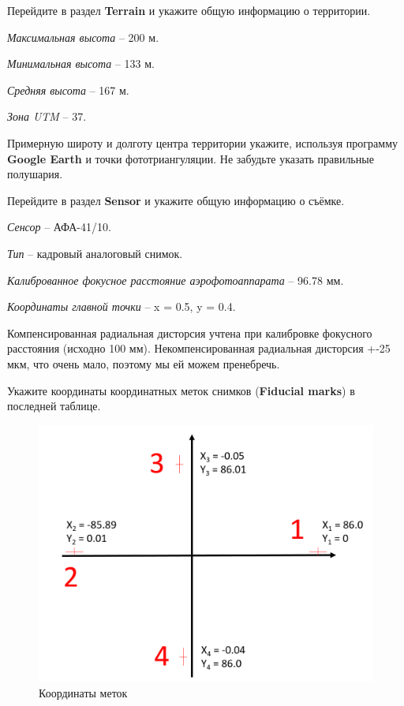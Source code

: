 \documentclass[
  12pt,
]{book}
\begin{document}
Перейдите в раздел \textbf{Terrain} и укажите общую информацию о территории.

\emph{Максимальная высота} -- 200 м.

\emph{Минимальная высота} -- 133 м.

\emph{Средняя высота} -- 167 м.

\emph{Зона UTM} -- 37.

Примерную широту и долготу центра территории укажите, используя программу \textbf{Google Earth} и точки фототриангуляции. Не забудьте указать правильные полушария.

Перейдите в раздел \textbf{Sensor} и укажите общую информацию о съёмке.

\emph{Сенсор} -- АФА-41/10.

\emph{Тип} -- кадровый аналоговый снимок.

\emph{Калиброванное фокусное расстояние аэрофотоаппарата} -- 96.78 мм.

\emph{Координаты главной точки} -- x = 0.5, y = 0.4.

Компенсированная радиальная дисторсия учтена при калибровке фокусного расстояния (исходно 100 мм). Некомпенсированная радиальная дисторсия +-25 мкм, что очень мало, поэтому мы ей можем пренебречь.

Укажите координаты координатных меток снимков (\textbf{Fiducial marks}) в последней таблице.

\begin{figure}
\centering
\includegraphics{images/Ref13/Fiducial.png}
\caption{Координаты меток}
\end{figure}
\end{document}
